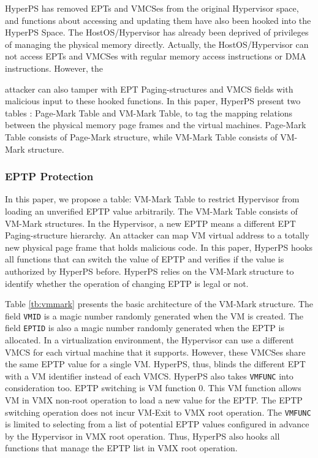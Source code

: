 HyperPS has removed EPTs and VMCSes from the original Hypervisor space, and functions about accessing and updating them have also been hooked into the HyperPS Space. 
The HostOS/Hypervisor has already been deprived of privileges of managing the physical memory directly. Actually, the HostOS/Hypervisor can not access EPTs and VMCSes with regular memory access instructions or DMA instructions. 
However, the 

attacker can also tamper with EPT Paging-structures and VMCS fields with malicious input to these hooked functions.
In this paper, HyperPS present two tables : Page-Mark Table and VM-Mark Table, to tag the mapping relations between the physical memory page frames and the virtual machines. Page-Mark Table consists of Page-Mark structure, while VM-Mark Table consists of VM-Mark structure.

\subsubsection{EPTP Protection}%
\label{ssub:eptp_protection}
In this paper, we propose a table: VM-Mark Table to restrict Hypervisor from loading an unverified EPTP value arbitrarily.
The VM-Mark Table consists of VM-Mark structures. 
In the Hypervisor, a new EPTP means a different EPT Paging-structure hierarchy. An attacker can map VM virtual address to a totally new physical page frame that holds malicious code. In this paper, HyperPS hooks all functions that can switch the value of EPTP and verifies if the value is authorized by HyperPS before. HyperPS relies on the VM-Mark structure to identify whether the operation of changing EPTP is legal or not. 

Table \ref{tb:vmmark} presents the basic architecture of the VM-Mark structure.
The field \verb|VMID| is a magic number randomly generated when the VM is created. 
The field \verb|EPTID| is also a magic number randomly generated when the EPTP is allocated.
In a virtualization environment,
the Hypervisor can use a different VMCS for each virtual machine that it supports. However, these VMCSes share the same EPTP value for a single VM. 
HyperPS, thus, blinds the different EPT with a VM identifier instead of each VMCS.
HyperPS also takes \verb|VMFUNC| into consideration too. EPTP switching is VM function 0. This VM function allows VM in VMX non-root operation to load a new value for the EPTP. The EPTP switching operation does not incur VM-Exit to VMX root operation.
The \verb|VMFUNC| is limited to selecting from a list of potential EPTP values configured in advance by the Hypervisor in VMX root operation. Thus, HyperPS also hooks all functions that manage the EPTP list in VMX root operation.

